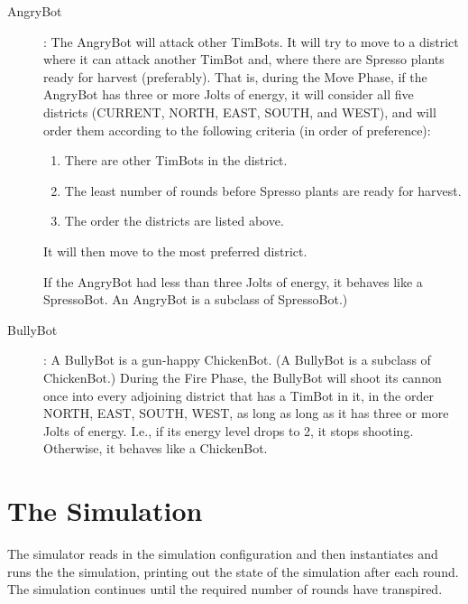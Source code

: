 \documentclass[12pt,pdftex]{article}
\begin{document}
\begin{description}
\item[AngryBot]: The AngryBot will attack other TimBots.
     It will try to move to a district where it can attack another TimBot
     and, where there are Spresso plants ready for harvest (preferably).
     That is, during the Move Phase, if the AngryBot has three or more Jolts 
     of energy, it will consider all five districts (CURRENT, NORTH, EAST, 
     SOUTH, and WEST), and will order them according to the following 
     criteria (in order of preference):
     \begin{enumerate}\NoItemSpace
     \item There are other TimBots in the district.
     \item The least number of rounds before Spresso plants are ready for
           harvest.
     \item The order the districts are listed above.
     \end{enumerate}
     It will then move to the most preferred district.  

     If the AngryBot had less than three Jolts of energy, it behaves
     like a SpressoBot.  An AngryBot is a subclass of
     SpressoBot.) 

\item[BullyBot]: A BullyBot is a gun-happy ChickenBot.  (A 
     BullyBot is a subclass of ChickenBot.)  During the Fire Phase,
     the BullyBot will shoot its cannon once into every adjoining district 
     that has a TimBot in it, in the order NORTH, EAST, SOUTH,
     WEST, as long as long as it has three or more Jolts of energy.  I.e.,
     if its energy level drops to 2, it stops shooting. Otherwise, it 
     behaves like a ChickenBot.
\end{description}


\section*{The Simulation}
The simulator reads in the simulation configuration and then
instantiates and runs the the simulation, printing out the state
of the simulation after each round.  The simulation continues until
the required number of rounds have transpired.
\end{document}
